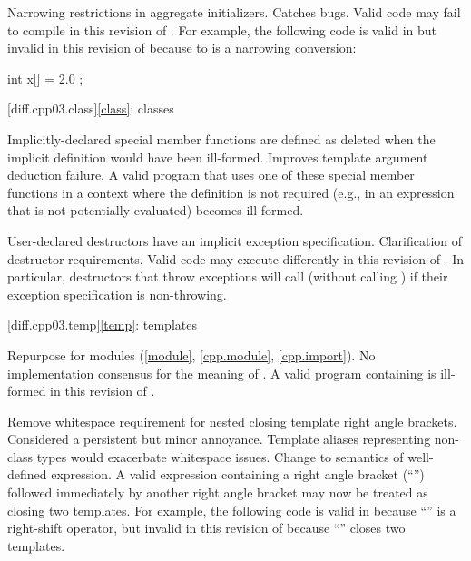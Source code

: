 \change
Narrowing restrictions in aggregate initializers.
\rationale
Catches bugs.
\effect
Valid \CppIII{} code may fail to compile in this revision of \Cpp{}. For
example, the following code is valid in \CppIII{} but invalid in this
revision of \Cpp{} because  to  is a narrowing
conversion:
\begin{codeblock}
int x[] = { 2.0 };
\end{codeblock}

[diff.cpp03.class]{\ref{class}: classes}

\change
Implicitly-declared special member functions are defined as deleted
when the implicit definition would have been ill-formed.
\rationale
Improves template argument deduction failure.
\effect
A valid \CppIII{} program that uses one of these special member functions in a
context where the definition is not required (e.g., in an expression that is
not potentially evaluated) becomes ill-formed.

\change
User-declared destructors have an implicit exception specification.
\rationale
Clarification of destructor requirements.
\effect
Valid \CppIII{} code may execute differently in this revision of \Cpp{}. In
particular, destructors that throw exceptions will call 
(without calling ) if their exception specification is
non-throwing.

[diff.cpp03.temp]{\ref{temp}: templates}

\change
Repurpose  for modules
(\ref{module}, \ref{cpp.module}, \ref{cpp.import}).
\rationale
No implementation consensus for the \CppIII{} meaning of .
\effect
A valid \CppIII{} program containing  is ill-formed in this
revision of \Cpp{}.

\change
Remove whitespace requirement for nested closing template right angle
brackets.
\rationale
Considered a persistent but minor annoyance. Template aliases
representing non-class types would exacerbate whitespace issues.
\effect
Change to semantics of well-defined expression. A valid \CppIII{} expression
containing a right angle bracket (``\tcode{>}'') followed immediately by
another right angle bracket may now be treated as closing two templates.
For example, the following code is valid in \CppIII{} because ``\tcode{>>}''
is a right-shift operator, but invalid in this revision of \Cpp{} because
``\tcode{>>}'' closes two templates.

